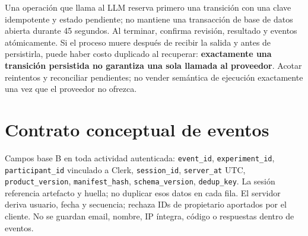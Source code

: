 \documentclass[11pt,a4paper]{report}
\begin{document}
Una operación que llama al LLM reserva primero una transición con una clave idempotente y estado pendiente; no mantiene una transacción de base de datos abierta durante 45 segundos. Al terminar, confirma revisión, resultado y eventos atómicamente. Si el proceso muere después de recibir la salida y antes de persistirla, puede haber costo duplicado al recuperar: \textbf{exactamente una transición persistida no garantiza una sola llamada al proveedor}. Acotar reintentos y reconciliar pendientes; no vender semántica de ejecución exactamente una vez que el proveedor no ofrezca.

\section{Contrato conceptual de eventos}
Campos base B en toda actividad autenticada: \texttt{event\_id}, \texttt{experiment\_id}, \texttt{participant\_id} vinculado a Clerk, \texttt{session\_id}, \texttt{server\_at} UTC, \texttt{product\_version}, \texttt{manifest\_hash}, \texttt{schema\_version}, \texttt{dedup\_key}. La sesión referencia artefacto y huella; no duplicar esos datos en cada fila. El servidor deriva usuario, fecha y secuencia; rechaza IDs de propietario aportados por el cliente. No se guardan email, nombre, IP íntegra, código o respuestas dentro de eventos.
\end{document}
